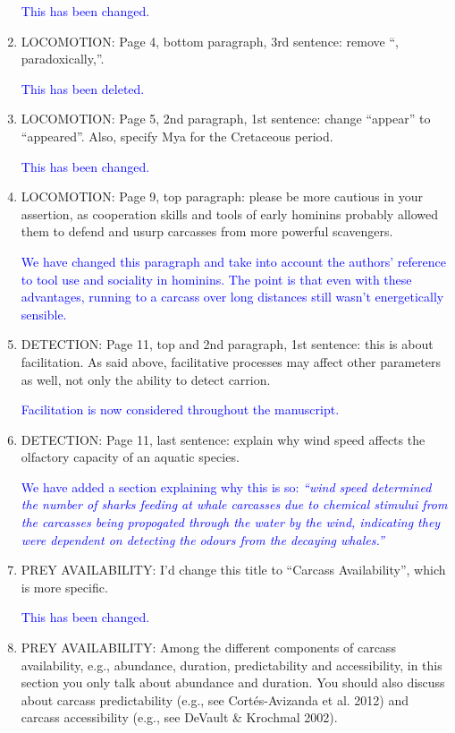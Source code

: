 \documentclass[12pt,letterpaper]{article}
\begin{document}
\begin{enumerate}
\textcolor{blue}{This has been changed.}

\item{LOCOMOTION:} Page 4, bottom paragraph, 3rd sentence: remove ``, paradoxically,''.

\textcolor{blue}{This has been deleted.}

\item{LOCOMOTION:} Page 5, 2nd paragraph, 1st sentence: change ``appear'' to ``appeared''. Also, specify Mya for the Cretaceous period.

\textcolor{blue}{This has been changed.}

\item{LOCOMOTION:} Page 9, top paragraph: please be more cautious in your assertion, as cooperation skills and tools of early hominins probably allowed them to defend and usurp carcasses from more powerful scavengers.

\textcolor{blue}{We have changed this paragraph and take into account the authors' reference to tool use and sociality in hominins. The point is that even with these advantages, running to a carcass over long distances still wasn't energetically sensible.}

\item{DETECTION:} Page 11, top and 2nd paragraph, 1st sentence: this is about facilitation. As said above, facilitative processes may affect other parameters as well, not only the ability to detect carrion.

\textcolor{blue}{Facilitation is now considered throughout the manuscript.}

\item{DETECTION:} Page 11, last sentence: explain why wind speed affects the olfactory capacity of an aquatic species.

\textcolor{blue}{We have added a section explaining why this is so: \textit{``wind speed determined the number of sharks feeding at whale carcasses due to chemical stimului from the carcasses being propogated through the water by the wind, indicating they were dependent on detecting the odours from the decaying whales.''}}

\item{PREY AVAILABILITY:} I'd change this title to ``Carcass Availability'', which is more specific.

\textcolor{blue}{This has been changed.}

\item{PREY AVAILABILITY:} Among the different components of carcass availability, e.g., abundance, duration, predictability and accessibility, in this section you only talk about abundance and duration. You should also discuss about carcass predictability (e.g., see Cort\'{e}s-Avizanda et al. 2012) and carcass accessibility (e.g., see DeVault \& Krochmal 2002).


\end{enumerate}
\end{document}
